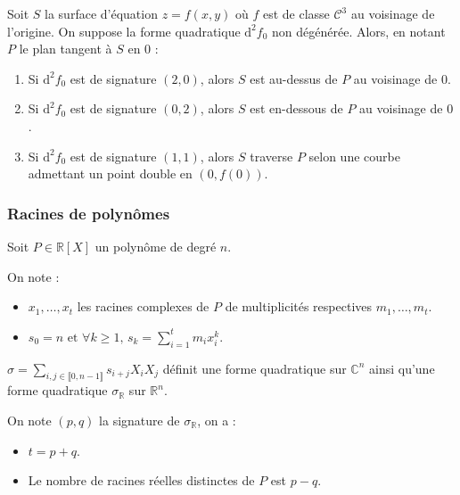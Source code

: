   \begin{application}
    Soit $S$ la surface d'équation $z = f(x, y)$ où $f$ est de classe $\mathcal{C}^3$ au voisinage de l'origine. On suppose la forme quadratique $\mathrm{d}^2 f_0$ non dégénérée. Alors, en notant $P$ le plan tangent à $S$ en $0$ :
    \begin{enumerate}[label=(\roman*)]
      \item Si $\mathrm{d}^2 f_0$ est de signature $(2, 0)$, alors $S$ est au-dessus de $P$ au voisinage de $0$.
      \item Si $\mathrm{d}^2 f_0$ est de signature $(0, 2)$, alors $S$ est en-dessous de $P$ au voisinage de $0$.
      \item Si $\mathrm{d}^2 f_0$ est de signature $(1, 1)$, alors $S$ traverse $P$ selon une courbe admettant un point double en $(0, f(0))$.
    \end{enumerate}
  \end{application}

  \subsubsection{Racines de polynômes}


  Soit $P \in \mathbb{R}[X]$ un polynôme de degré $n$.

  \begin{notation}
    On note :
    \begin{itemize}
      \item $x_1, \dots, x_t$ les racines complexes de $P$ de multiplicités respectives $m_1, \dots, m_t$.
      \item $s_0 = n \text{ et } \forall k \geq 1, \, s_k = \sum_{i=1}^t m_i x_i^k$.
    \end{itemize}
  \end{notation}

  \begin{proposition}
    $\sigma = \sum_{i, j \in \llbracket 0, n-1 \rrbracket} s_{i+j} X_i X_j$ définit une forme quadratique sur $\mathbb{C}^n$ ainsi qu'une forme quadratique $\sigma_{\mathbb{R}}$ sur $\mathbb{R}^n$.
  \end{proposition}


  \begin{theorem}
    On note $(p,q)$ la signature de $\sigma_{\mathbb{R}}$, on a :
    \begin{itemize}
      \item $t = p + q$.
      \item Le nombre de racines réelles distinctes de $P$ est $p-q$.
    \end{itemize}
  \end{theorem}

